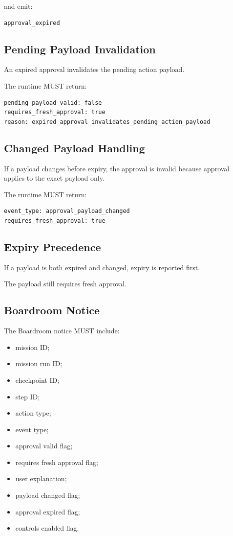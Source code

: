 and emit:

\begin{verbatim}
approval_expired
\end{verbatim}

\subsection{Pending Payload Invalidation}

An expired approval invalidates the pending action payload.

The runtime MUST return:

\begin{verbatim}
pending_payload_valid: false
requires_fresh_approval: true
reason: expired_approval_invalidates_pending_action_payload
\end{verbatim}

\subsection{Changed Payload Handling}

If a payload changes before expiry, the approval is invalid because approval applies to the exact payload only.

The runtime MUST return:

\begin{verbatim}
event_type: approval_payload_changed
requires_fresh_approval: true
\end{verbatim}

\subsection{Expiry Precedence}

If a payload is both expired and changed, expiry is reported first.

The payload still requires fresh approval.

\subsection{Boardroom Notice}

The Boardroom notice MUST include:

\begin{itemize}
  \item mission ID;
  \item mission run ID;
  \item checkpoint ID;
  \item step ID;
  \item action type;
  \item event type;
  \item approval valid flag;
  \item requires fresh approval flag;
  \item user explanation;
  \item payload changed flag;
  \item approval expired flag;
  \item controls enabled flag.
\end{itemize}

